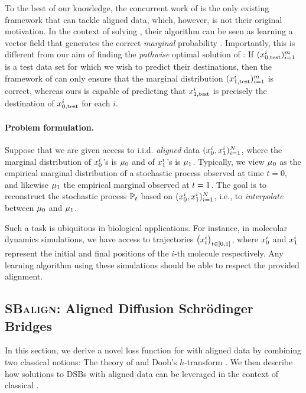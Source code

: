 To the best of our knowledge, the concurrent work of \citet{tong2023conditional} is the only existing framework that can tackle aligned data, which, however, is not their original motivation. In the context of solving , their algorithm can be seen as learning a vector field that generates the correct \emph{marginal} probability \citep[cf.][Proposition 4.3]{tong2023conditional}. Importantly, this is different from our aim of finding the \emph{pathwise} optimal solution of : If $(x^i_{0,\textup{test}})_{i=1}^m$ is a test data set for which we wish to predict their destinations, then the framework of \citet{tong2023conditional} can only ensure that the marginal distribution $(x^i_{1,\textup{test}})_{i=1}^m$ is correct, whereas ours is capable of predicting that $x^i_{1,\textup{test}}$ is precisely the destination of $x^i_{0,\textup{test}}$ for each $i$. 

\paragraph{Problem formulation.}

Suppose that we are given access to i.i.d. \emph{aligned} data $(x_0^i,x_1^i)_{i=1}^N$, where the marginal distribution of $x^i_0$'s is $\mu_0$ and of $x_1^i$'s is $\mu_1$. Typically, we view $\mu_0$ as the empirical marginal distribution of a stochastic process observed at time $t= 0$, and likewise $\mu_1$ the empirical marginal observed at $t=1$. The goal is to reconstruct the stochastic process $\mathbb{P}_{{t}}$ based on $(x_0^i,x_1^i)_{i=1}^N$, i.e., to \emph{interpolate} between $\mu_0$ and $\mu_1$.

Such a task is ubiquitous in biological applications. For instance, in molecular dynamics simulations, we have access to trajectories $\left(x_t^i\right)_{t \in [0, 1]}$, where $x_0^i$ and $x_1^i$ represent the initial and final positions of the $i$-th molecule respectively. Any learning algorithm using these simulations should be able to respect the provided alignment. 

\subsection{\textsc{SBalign}: Aligned Diffusion Schr{\"o}dinger Bridges}

In this section, we derive a novel loss function for  with aligned data by combining two classical notions: The theory of  \citep{schrodinger1931umkehrung,leonard2013survey,chen2021stochastic} and Doob's $h$-transform \citep{doob1984classical, rogers2000diffusions}. We then describe how solutions to DSBs with aligned data can be leveraged in the context of classical .

